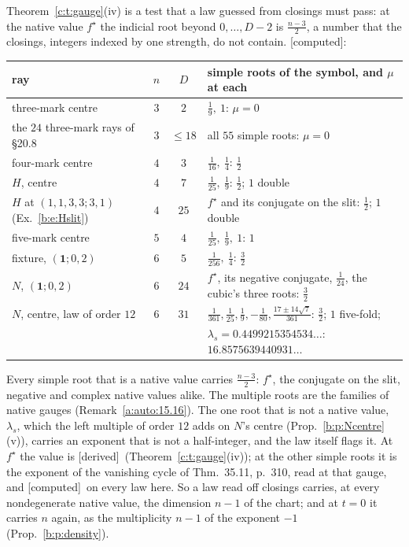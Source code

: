\documentclass[11pt]{article}
\newcommand{\one}{\mathbf 1}
\theoremstyle{plain}
\theoremstyle{definition}
\theoremstyle{remark}
\newcommand{\derived}{\textup{[derived]}}
\newcommand{\computed}{\textup{[computed]}}
\begin{document}
Theorem~\ref{c:t:gauge}(iv) is a test that a law guessed from closings must pass: at the native value $f^\star$ the indicial root beyond $0,\dots,D-2$ is $\frac{n-3}2$, a number that the closings, integers indexed by one strength, do not contain. \computed:
\begin{center}
\small
\begin{tabular}{@{}l c c l@{}}
\toprule
ray & $n$ & $D$ & simple roots of the symbol, and $\mu$ at each\\ \midrule
three-mark centre & $3$ & $2$ & $\frac19,\ 1$: $\mu=0$\\
the $24$ three-mark rays of \S20.8 & $3$ & $\le18$ & all $55$ simple roots: $\mu=0$\\
four-mark centre & $4$ & $3$ & $\frac1{16},\ \frac14$: $\frac12$\\
$H$, centre & $4$ & $7$ & $\frac1{25},\ \frac19$: $\frac12$; $1$ double\\
$H$ at $(1,1,3,3;3,1)$ (Ex.~\ref{b:e:Hslit}) & $4$ & $25$ & $f^\star$ and its conjugate on the slit: $\frac12$; $1$ double\\
five-mark centre & $5$ & $4$ & $\frac1{25},\ \frac19,\ 1$: $1$\\
fixture, $(\one;0,2)$ & $6$ & $5$ & $\frac1{256},\ \frac14$: $\frac32$\\
$N$, $(\one;0,2)$ & $6$ & $24$ & $f^\star$, its negative conjugate, $\frac1{24}$, the cubic's three roots: $\frac32$\\
$N$, centre, law of order $12$ & $6$ & $31$ & $\frac1{361},\frac1{25},\frac19,-\frac1{80},\frac{17\pm14\sqrt7}{361}$: $\frac32$; $1$ five-fold;\\
 & & & $\lambda_s=0.4499215354534\ldots$: $16.8575639440931\ldots$\\
\bottomrule
\end{tabular}
\end{center}
Every simple root that is a native value carries $\frac{n-3}2$: $f^\star$, the conjugate on the slit, negative and complex native values alike. The multiple roots are the families of native gauges (Remark~\ref{a:auto:15.16}). The one root that is not a native value, $\lambda_s$, which the left multiple of order $12$ adds on $N$'s centre (Prop.~\ref{b:p:Ncentre}(v)), carries an exponent that is not a half-integer, and the law itself flags it. At $f^\star$ the value is \derived\ (Theorem~\ref{c:t:gauge}(iv)); at the other simple roots it is the exponent of the vanishing cycle of Thm.~35.11, p.~310, read at that gauge, and \computed\ on every law here. So a law read off closings carries, at every nondegenerate native value, the dimension $n-1$ of the chart; and at $t=0$ it carries $n$ again, as the multiplicity $n-1$ of the exponent $-1$ (Prop.~\ref{b:p:density}).
\end{document}
